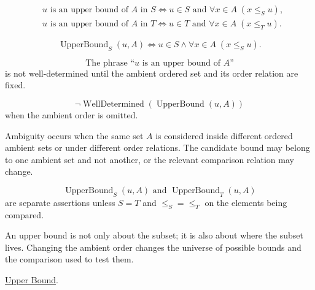 \begin{remark*}
\[
\begin{aligned}
&u\text{ is an upper bound of }A\text{ in }S
\Longleftrightarrow
u\in S\text{ and }\forall x\in A\;(x\le_S u),\\
&u\text{ is an upper bound of }A\text{ in }T
\Longleftrightarrow
u\in T\text{ and }\forall x\in A\;(x\le_T u).
\end{aligned}
\]
\end{remark*}

\begin{remark*}
\[
\operatorname{UpperBound}_S(u,A)
\Longleftrightarrow
u\in S\land \forall x\in A\;(x\le_S u).
\]
\end{remark*}

\begin{remark*}
\[
\text{The phrase ``}u\text{ is an upper bound of }A\text{''}
\]
is not well-determined until the ambient ordered set and its order relation are fixed.
\end{remark*}

\begin{remark*}
\[
\neg\operatorname{WellDetermined}(\operatorname{UpperBound}(u,A))
\]
when the ambient order is omitted.
\end{remark*}

\begin{remark*}
Ambiguity occurs when the same set $A$ is considered inside different ordered ambient sets or under different order relations. The candidate bound may belong to one ambient set and not another, or the relevant comparison relation may change.
\end{remark*}

\begin{remark*}
\[
\operatorname{UpperBound}_S(u,A)
\text{ and }
\operatorname{UpperBound}_T(u,A)
\]
are separate assertions unless $S=T$ and $\le_S=\le_T$ on the elements being compared.
\end{remark*}

\begin{remark*}[Interpretation]
An upper bound is not only about the subset; it is also about where the subset lives. Changing the ambient order changes the universe of possible bounds and the comparison used to test them.
\end{remark*}

\begin{dependencies}
\hyperref[def:upper-bound]{Upper Bound}.
\end{dependencies}


